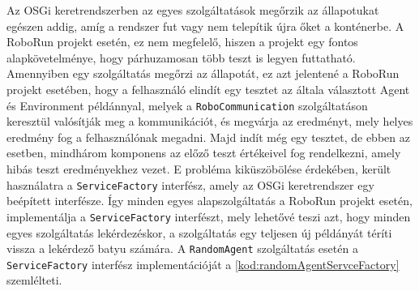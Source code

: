 Az OSGi keretrendszerben az egyes szolgáltatások megőrzik az állapotukat egészen addig, amíg a rendszer fut vagy nem telepítik újra őket a konténerbe. A RoboRun projekt esetén, ez nem megfelelő, hiszen a projekt egy fontos alapkövetelménye, hogy párhuzamosan több teszt is legyen futtatható. Amennyiben egy szolgáltatás megőrzi az állapotát, ez azt jelentené a RoboRun projekt esetében, hogy a felhasználó elindít egy tesztet az általa választott Agent és Environment példánnyal, melyek a \texttt{RoboCommunication} szolgáltatáson keresztül valósítják meg a kommunikációt, és megvárja az eredményt, mely helyes eredmény fog a felhasználónak megadni. Majd indít még egy tesztet, de ebben az esetben, mindhárom komponens az előző teszt értékeivel fog rendelkezni, amely hibás teszt eredményekhez vezet. E probléma kiküszöbölése érdekében, került használatra a  \texttt{ServiceFactory} interfész, amely az OSGi keretrendszer egy beépített interfésze. Így minden egyes alapszolgáltatás a RoboRun projekt esetén, implementálja a  \texttt{ServiceFactory} interfészt, mely lehetővé teszi azt, hogy minden egyes szolgáltatás lekérdezéskor, a szolgáltatás egy teljesen új példányát téríti vissza a lekérdező batyu számára. A \texttt{RandomAgent} szolgáltatás esetén a \texttt{ServiceFactory} interfész implementációját a \ref{kod:randomAgentServceFactory} szemlélteti.
\lstset{language=Java}
\label{kod:randomAgentServceFactory}





